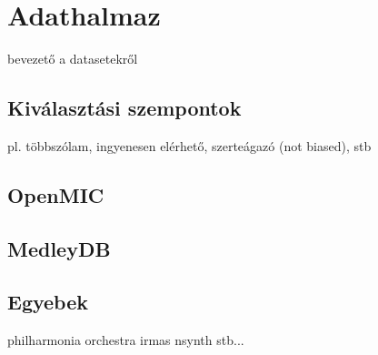 \chapter{Adathalmaz}
\label{ch:dataset}

bevezető a datasetekről

\section{Kiválasztási szempontok}

pl. többszólam, ingyenesen elérhető, szerteágazó (not biased), stb

\section{OpenMIC}

\section{MedleyDB}

\section{Egyebek}
philharmonia orchestra
irmas
nsynth
stb...
